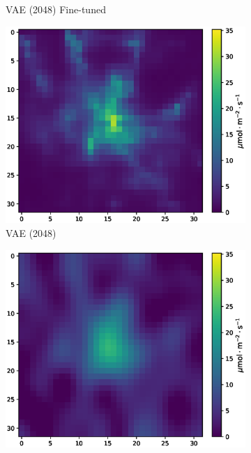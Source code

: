 \begin{figure}[htb]
\begin{minipage}[b]{\textwidth}
\begin{subfigure}[b]{0.32\textwidth}
            \caption{\gls{VAE} (2048) Fine-tuned}
        \end{subfigure}
        \begin{subfigure}[b]{0.32\textwidth}
            \includegraphics[width=\textwidth]{figures/06_results/gaussian_plume_example/munich/gen_2048_snr_20_db.eps}
            \caption{\gls{VAE} (2048)}
        \end{subfigure}
        \begin{subfigure}[b]{0.32\textwidth}
            \includegraphics[width=\textwidth]{figures/06_results/gaussian_plume_example/munich/bp_dct_snr_20_db.eps}

\end{subfigure}
\end{minipage}
\end{figure}
